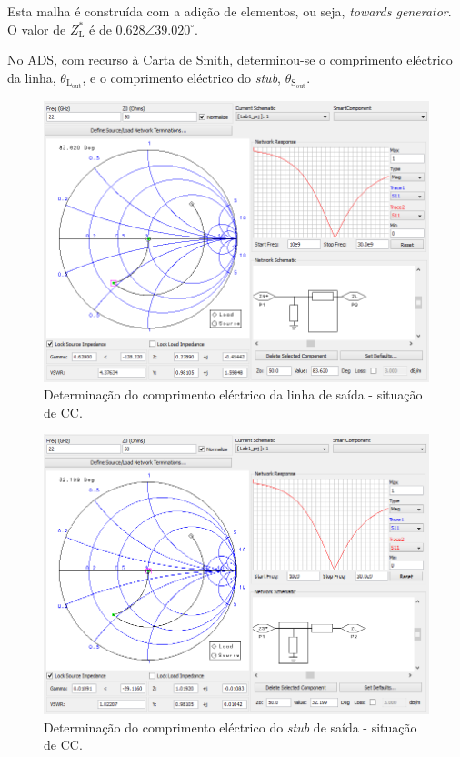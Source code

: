 \documentclass[11pt]{article}
\numberwithin{equation}{section}
\begin{document}
Esta malha é construída com a adição de elementos, ou seja, \textit{towards generator}. O valor de $Z_{\text{L}}^{*}$ é de $0.628\angle39.020 ^{\circ}$.

No ADS, com recurso à Carta de Smith, determinou-se o comprimento eléctrico da linha, $\theta_{\text{L}_{\text{out}}}$, e o comprimento eléctrico do \textit{stub}, $\theta_{\text{S}_{\text{out}}}$. 

\begin{figure}[H]
	\centering
	\includegraphics[keepaspectratio=true, scale=0.45]{exps/Carga_CC_line}
	\vspace{-0.5em}
	\caption{Determinação do comprimento eléctrico da linha de saída - situação de CC.}
	\vspace{-0.8em}
\end{figure}

\begin{figure}[H]
	\centering
	\includegraphics[keepaspectratio=true, scale=0.45]{exps/Carga_CC_stub}
	\vspace{-0.5em}
	\caption{Determinação do comprimento eléctrico do \textit{stub} de saída - situação de CC.}
	\vspace{-0.8em}
\end{figure}
\end{document}
